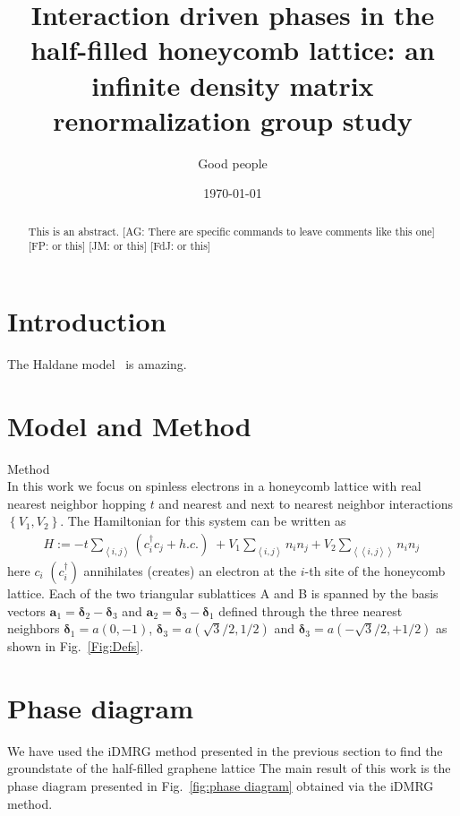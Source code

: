 \documentclass[aps,prx,10pt,twocolumn,floatfix,superscriptaddress,showpacs,numerical,footinbib]{revtex4-1}
\newcommand{\noteAG}[1]{{\color{blue} [AG: #1]}}
\newcommand{\noteFP}[1]{{\color{magenta} [FP: #1]}}
\newcommand{\noteJM}[1]{{\color{red} [JM: #1]}}
\newcommand{\noteFdJ}[1]{{\color{cyan} [FdJ: #1]}}
\newcommand{\bs}[1]{{\boldsymbol{#1}}}
\begin{document}
%
\title{Interaction driven phases in the half-filled honeycomb lattice: an infinite density matrix renormalization group study}
%
\author{Good people}
%
\date{\today}
%
\begin{abstract}
%
This is an abstract. \noteAG{There are specific commands to leave comments like this one}\noteFP{or this}\noteJM{or this}\noteFdJ{or this}
%
\end{abstract}
%
\maketitle
%

\section{Introduction}
%
The Haldane model~\cite{H88} is amazing.
%
\section{Model and Method}
%
Method\\
%
In this work we focus on spinless electrons in a honeycomb lattice with real  nearest neighbor hopping $t$ and nearest and next to nearest neighbor interactions 
$\left\lbrace V_{1},V_{2}\right\rbrace$. 
%
The Hamiltonian for this system can be written as
\begin{eqnarray}
%
H:=-t\sum_{\left\langle i,j\right\rangle }(c^{\dagger}_{i}c_{j}+h.c.)
%
\;+
V_{1}\sum_{\left\langle i,j\right\rangle }n_{i}n_{j}+
%
V_{2}\sum_{\left\langle \left\langle i,j\right\rangle \right\rangle }n_{i}n_{j}\,
%
\label{eq:H}
%
\end{eqnarray}
%
here $c_{i}$ $(c^{\dagger}_{i})$  annihilates (creates) an electron at the $i$-th site of the honeycomb lattice. 
%
Each of the two triangular sublattices A and B is spanned by the basis vectors
$\bs{a}_{1}=\bs{\delta}_{2}-\bs{\delta}_{3}$ and 
$\bs{a}_{2}=\bs{\delta}_{3}-\bs{\delta}_{1}$ defined through the three nearest neighbors $\bs{\delta}_{1}=a(0,-1)$,  
$\bs{\delta}_{3}=a(\sqrt{3}/2,1/2)$ and $\bs{\delta}_{3}=a(-\sqrt{3}/2,+1/2)$ as shown in Fig.~\ref{Fig:Defs}.
%
\section{Phase diagram}
%
We have used the iDMRG method presented in the previous section
to find the groundstate of the half-filled graphene lattice 
The main result of this work is the phase diagram presented in Fig.~\ref{fig:phase diagram} obtained
via the iDMRG method. 
%
\end{document}
